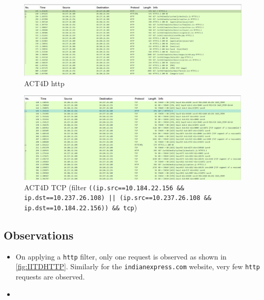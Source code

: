 \documentclass{article}
\begin{document}
\begin{figure}[!ht]
    \centering
    \includegraphics[scale=0.5]{images/act4d http.png}
    \caption{ACT4D http}
    \label{fig:ACT4DHTTP}
\end{figure}

\begin{figure}[!ht]
    \centering
    \includegraphics[scale=0.5]{images/act4d tcp.png}
    \caption{ACT4D TCP (filter {\tt ((ip.src==10.184.22.156 \&\& ip.dst==10.237.26.108) || 
    (ip.src==10.237.26.108 \&\& ip.dst==10.184.22.156)) \&\& tcp})}
    \label{fig:ACT4DTCP}
\end{figure}

\subsection*{Observations}
\begin{itemize}
    \item On applying a {\tt http} filter, only one request is observed as shown in \cref{fig:IITDHTTP}. Similarly for the {\tt indianexpress.com} website, very few {\tt http} requests are observed.
    \item 
\end{itemize}

\clearpage

\end{document}
